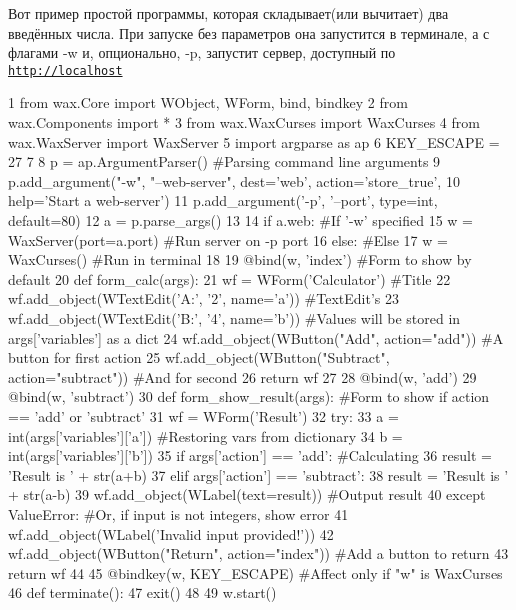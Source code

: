 Вот пример простой программы, которая складывает(или вычитает) два введённых числа. При запуске без параметров она запустится в терминале, а с флагами {\ttfamily -\/w} и, опционально, {\ttfamily -\/p}, запустит сервер, доступный по {\ttfamily \href{http://localhost}{\tt http\+://localhost}} 
\begin{DoxyCode}
1 from wax.Core import WObject, WForm, bind, bindkey
2 from wax.Components import *
3 from wax.WaxCurses import WaxCurses
4 from wax.WaxServer import WaxServer
5 import argparse as ap
6 KEY\_ESCAPE = 27
7 
8 p = ap.ArgumentParser()                                                  #Parsing command line arguments
9 p.add\_argument("-w", "--web-server", dest='web', action='store\_true',
10                help='Start a web-server')
11 p.add\_argument('-p', '--port', type=int, default=80)
12 a = p.parse\_args()
13 
14 if a.web:                                                    #If '-w' specified
15   w = WaxServer(port=a.port)                                 #Run server on -p port
16 else:                                                        #Else
17   w = WaxCurses()                                            #Run in terminal
18 
19 @bind(w, 'index')                                            #Form to show by default
20 def form\_calc(args):
21   wf = WForm('Calculator')                                   #Title
22   wf.add\_object(WTextEdit('A:', '2', name='a'))              #TextEdit's
23   wf.add\_object(WTextEdit('B:', '4', name='b'))              #Values will be stored in args['variables'] as
       a dict
24   wf.add\_object(WButton("Add", action="add"))                #A button for first action
25   wf.add\_object(WButton("Subtract", action="subtract"))      #And for second
26   return wf
27 
28 @bind(w, 'add')
29 @bind(w, 'subtract')
30 def form\_show\_result(args):                                  #Form to show if action == 'add' or 'subtract'
31   wf = WForm('Result')
32   try:
33     a = int(args['variables']['a'])                          #Restoring vars from dictionary
34     b = int(args['variables']['b'])
35     if args['action'] == 'add':                              #Calculating
36       result = 'Result is ' + str(a+b)
37     elif args['action'] == 'subtract':
38       result = 'Result is ' + str(a-b)
39     wf.add\_object(WLabel(text=result))                       #Output result
40   except ValueError:                                         #Or, if input is not integers, show error
41     wf.add\_object(WLabel('Invalid input provided!'))
42   wf.add\_object(WButton("Return", action="index"))           #Add a button to return
43   return wf
44 
45 @bindkey(w, KEY\_ESCAPE)                                      #Affect only if "w" is WaxCurses
46 def terminate():
47   exit()
48 
49 w.start()
\end{DoxyCode}
